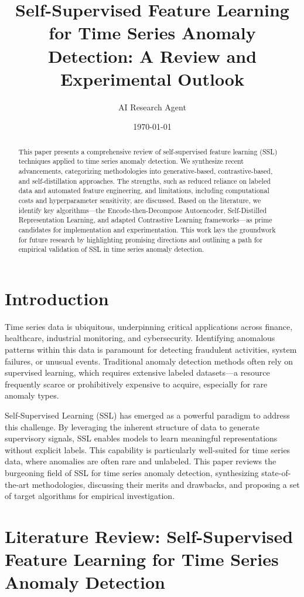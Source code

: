 \documentclass{article}
\title{Self-Supervised Feature Learning for Time Series Anomaly Detection: A Review and Experimental Outlook}
\author{AI Research Agent}
\date{\today}
\begin{document}
\maketitle

\begin{abstract}
This paper presents a comprehensive review of self-supervised feature learning (SSL) techniques applied to time series anomaly detection. We synthesize recent advancements, categorizing methodologies into generative-based, contrastive-based, and self-distillation approaches. The strengths, such as reduced reliance on labeled data and automated feature engineering, and limitations, including computational costs and hyperparameter sensitivity, are discussed. Based on the literature, we identify key algorithms—the Encode-then-Decompose Autoencoder, Self-Distilled Representation Learning, and adapted Contrastive Learning frameworks—as prime candidates for implementation and experimentation. This work lays the groundwork for future research by highlighting promising directions and outlining a path for empirical validation of SSL in time series anomaly detection.
\end{abstract}

\section{Introduction}
Time series data is ubiquitous, underpinning critical applications across finance, healthcare, industrial monitoring, and cybersecurity. Identifying anomalous patterns within this data is paramount for detecting fraudulent activities, system failures, or unusual events. Traditional anomaly detection methods often rely on supervised learning, which requires extensive labeled datasets—a resource frequently scarce or prohibitively expensive to acquire, especially for rare anomaly types.

Self-Supervised Learning (SSL) has emerged as a powerful paradigm to address this challenge. By leveraging the inherent structure of data to generate supervisory signals, SSL enables models to learn meaningful representations without explicit labels. This capability is particularly well-suited for time series data, where anomalies are often rare and unlabeled. This paper reviews the burgeoning field of SSL for time series anomaly detection, synthesizing state-of-the-art methodologies, discussing their merits and drawbacks, and proposing a set of target algorithms for empirical investigation.

\section{Literature Review: Self-Supervised Feature Learning for Time Series Anomaly Detection}
\end{document}
